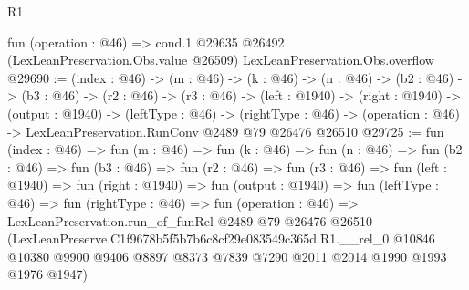 \begin{lexlean}{R1}
\begin{coremodule}
  fun (operation : @46) =>
  cond.{1} @29635 @26492 (LexLeanPreservation.Obs.value @26509) LexLeanPreservation.Obs.overflow
@29690 := (index : @46) ->
  (m : @46) ->
  (k : @46) ->
  (n : @46) ->
  (b2 : @46) ->
  (b3 : @46) ->
  (r2 : @46) ->
  (r3 : @46) ->
  (left : @1940) ->
  (right : @1940) ->
  (output : @1940) ->
  (leftType : @46) ->
  (rightType : @46) -> (operation : @46) -> LexLeanPreservation.RunConv @2489 @79 @26476 @26510
@29725 := fun (index : @46) =>
  fun (m : @46) =>
  fun (k : @46) =>
  fun (n : @46) =>
  fun (b2 : @46) =>
  fun (b3 : @46) =>
  fun (r2 : @46) =>
  fun (r3 : @46) =>
  fun (left : @1940) =>
  fun (right : @1940) =>
  fun (output : @1940) =>
  fun (leftType : @46) =>
  fun (rightType : @46) =>
  fun (operation : @46) =>
  LexLeanPreservation.run_of_funRel
    @2489
    @79
    @26476
    @26510
    (LexLeanPreserve.C1f9678b5f5b7b6c8cf29e083549c365d.R1.__rel_0
      @10846
      @10380
      @9900
      @9406
      @8897
      @8373
      @7839
      @7290
      @2011
      @2014
      @1990
      @1993
      @1976
      @1947)
\end{coremodule}
\end{lexlean}
